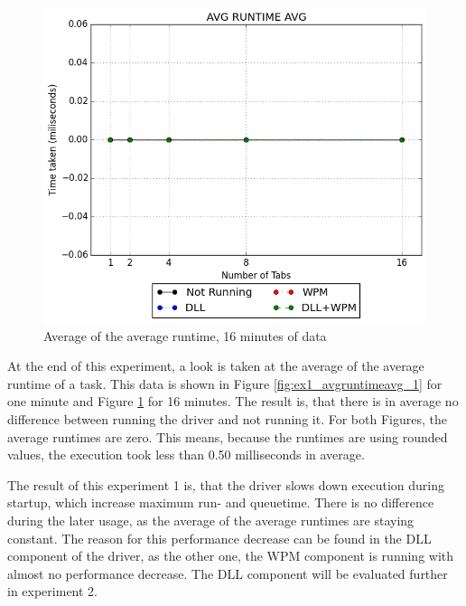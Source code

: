 \begin{figure}[!htbp]
	\centering
    \includegraphics[width=\textwidth,keepaspectratio]{Evaluation/experiment1/AVG-RUNTIME-AVG-16.png}
    \caption{Average of the average runtime, 16 minutes of data}
    \label{fig:ex1_avgruntimeavg_16}
\end{figure}
At the end of this experiment, a look is taken at the average of the average runtime of a task. This data is shown in Figure \ref{fig:ex1_avgruntimeavg_1} for one minute and Figure \ref{fig:ex1_avgruntimeavg_16} for 16 minutes. The result is, that there is in average no difference between running the driver and not running it. For both Figures, the average runtimes are zero. This means, because the runtimes are using rounded values, the execution took less than 0.50 milliseconds in average.

\medskip

The result of this experiment 1 is, that the driver slows down execution during startup, which increase maximum run- and queuetime. There is no difference during the later usage, as the average of the average runtimes are staying constant. The reason for this performance decrease can be found in the DLL component of the driver, as the other one, the WPM component is running with almost no performance decrease. The DLL component will be evaluated further in experiment 2.